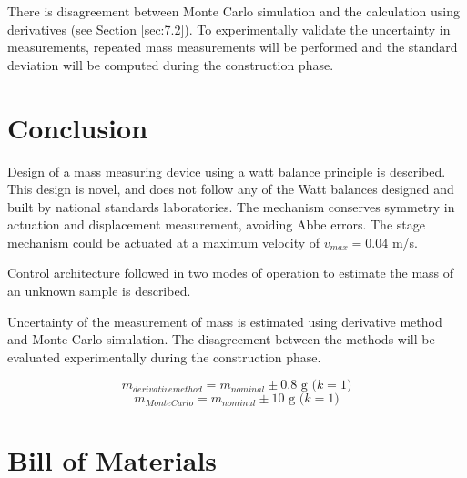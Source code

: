 \documentclass[12pt]{article}
\begin{document}
There is  disagreement between Monte Carlo simulation and the calculation using derivatives (see Section \ref{sec:7.2}). To experimentally validate the uncertainty in measurements, repeated mass measurements will be performed and the standard deviation will be computed during the construction phase. 

\section{Conclusion}
Design of a mass measuring device using a watt balance principle is described. This design is novel, and does not follow any of the Watt balances designed and built by national standards laboratories. The mechanism conserves symmetry in actuation and displacement measurement, avoiding Abbe errors. The stage mechanism could be actuated at a maximum velocity of $v_{max}= 0.04$ m/s.

Control architecture followed in two modes of operation to estimate the mass of an unknown sample is described.

Uncertainty of the measurement of mass is estimated using derivative method and Monte Carlo simulation. The disagreement between the methods will be evaluated experimentally during the construction phase.

$$m_{derivative method}=m_{nominal}\pm0.8\textrm{ g (}k=1\textrm{)}$$
$$m_{Monte Carlo}=m_{nominal}\pm10\textrm{ g (}k=1\textrm{)}$$


\pagebreak


\section{Bill of Materials}

\end{document}

